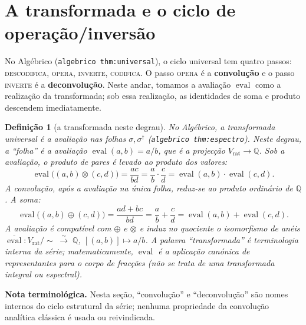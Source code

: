 \documentclass[11pt,a4paper]{article}
\newtheorem{definicao}{Definição}
\newcommand{\code}[1]{\texttt{\small #1}}
\newcommand{\dg}{^{\dagger}}
\begin{document}
\section{A transformada e o ciclo de operação/inversão}\label{sec:conv}

No Algébrico (\code{algebrico thm:universal}), o ciclo universal tem quatro
passos: \textsc{descodifica}, \textsc{opera}, \textsc{inverte},
\textsc{codifica}. O passo \textsc{opera} é a \textbf{convolução} e o passo
\textsc{inverte} é a \textbf{deconvolução}. Neste andar, tomamos a avaliação $\operatorname{eval}$ como a realização da
transformada; sob essa realização, as identidades de soma e produto descendem
imediatamente.

\begin{definicao}[a transformada neste degrau]\label{def:transf}
No Algébrico, a transformada universal é a avaliação nas folhas
$\sigma,\sigma\dg$ (\code{algebrico thm:espectro}). Neste degrau, a
``folha'' é a avaliação $\operatorname{eval}(a,b)=a/b$, que é a projecção
$V_{\mathrm{rat}}\to\mathbb{Q}$. Sob a avaliação, o produto de pares é
levado ao produto dos valores:
\[
\operatorname{eval}\bigl((a,b)\otimes(c,d)\bigr)
= \frac{ac}{bd}
= \frac{a}{b}\cdot\frac{c}{d}
= \operatorname{eval}(a,b)\cdot\operatorname{eval}(c,d).
\]
A convolução, após a avaliação na única folha, reduz-se ao produto ordinário
de $\mathbb{Q}$. A soma:
\[
\operatorname{eval}\bigl((a,b)\oplus(c,d)\bigr)
= \frac{ad+bc}{bd}
= \frac{a}{b}+\frac{c}{d}
= \operatorname{eval}(a,b)+\operatorname{eval}(c,d).
\]
A avaliação é compatível com $\oplus$ e $\otimes$ e induz no quociente o
isomorfismo de anéis
$\overline{\operatorname{eval}}:V_{\mathrm{rat}}/{\sim}\;\xrightarrow{\sim}\;\mathbb{Q}$,
$[(a,b)]\longmapsto a/b$. A palavra ``transformada'' é terminologia interna da
série; matematicamente, $\operatorname{eval}$ é a aplicação canónica de
representantes para o corpo de fracções (não se trata de uma transformada
integral ou espectral).
\end{definicao}

\noindent\textbf{Nota terminológica.} Nesta seção, ``convolução'' e
``deconvolução'' são nomes internos do ciclo estrutural da série; nenhuma
propriedade da convolução analítica clássica é usada ou reivindicada.
\end{document}
